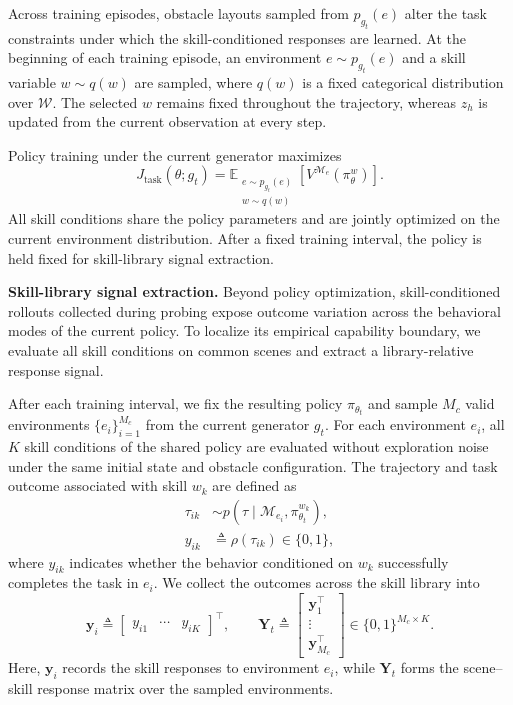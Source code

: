 \documentclass[conference]{IEEEtran}
\begin{document}
Across training episodes, obstacle layouts sampled from $p_{g_t}(e)$ alter the
task constraints under which the skill-conditioned responses are learned. At
the beginning of each training episode, an environment $e\sim p_{g_t}(e)$ and a
skill variable $w\sim q(w)$ are sampled, where $q(w)$ is a fixed categorical
distribution over $\mathcal W$. The selected $w$ remains fixed throughout the
trajectory, whereas $z_h$ is updated from the current observation at every step.

Policy training under the current generator maximizes
\begin{equation}
 J_{\mathrm{task}}(\theta;g_t)
 =
 \mathbb E_{\substack{e\sim p_{g_t}(e)\\w\sim q(w)}}
 \left[
 V^{\mathcal M_e}\!\left(\pi_\theta^w\right)
 \right].
 \label{eq:generator-policy-objective}
\end{equation}
All skill conditions share the policy parameters and are jointly optimized on
the current environment distribution. After a fixed training interval, the
policy is held fixed for skill-library signal extraction.

\textbf{Skill-library signal extraction.}
Beyond policy optimization, skill-conditioned rollouts collected during probing
expose outcome variation across the behavioral modes of the current policy. To
localize its empirical capability boundary, we evaluate all skill conditions on
common scenes and extract a library-relative response signal.

After each training interval, we fix the resulting policy $\pi_{\theta_t}$ and
sample $M_c$ valid environments $\{e_i\}_{i=1}^{M_c}$ from the current generator
$g_t$. For each environment $e_i$, all $K$ skill conditions of the shared policy
are evaluated without exploration noise under the same initial state and
obstacle configuration. The trajectory and task outcome associated with skill
$w_k$ are defined as
\begin{equation}
 \begin{aligned}
  \tau_{ik}
  &\sim
  p\!\left(
  \tau\mid\mathcal M_{e_i},\pi_{\theta_t}^{w_k}
  \right),\\
  y_{ik}
  &\triangleq
  \rho(\tau_{ik})\in\{0,1\},
 \end{aligned}
 \label{eq:skill-conditioned-outcome}
\end{equation}
where $y_{ik}$ indicates whether the behavior conditioned on $w_k$ successfully
completes the task in $e_i$. We collect the outcomes across the skill library
into
\begin{equation}
 \mathbf y_i
 \triangleq
 \begin{bmatrix}
  y_{i1} & \cdots & y_{iK}
 \end{bmatrix}^{\!\top},
 \qquad
 \mathbf Y_t
 \triangleq
 \begin{bmatrix}
  \mathbf y_1^\top\\
  \vdots\\
  \mathbf y_{M_c}^\top
 \end{bmatrix}
 \in\{0,1\}^{M_c\times K}.
 \label{eq:skill-response-matrix}
\end{equation}
Here, $\mathbf y_i$ records the skill responses to environment $e_i$, while
$\mathbf Y_t$ forms the scene--skill response matrix over the sampled
environments.
\end{document}
